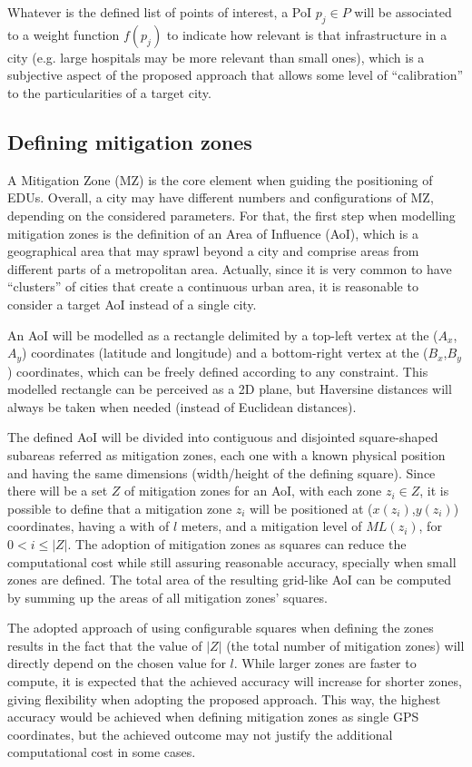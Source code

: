 \begin{refsection}
Whatever is the defined list of points of interest, a PoI $p_j \in P$ will be associated to a weight function $f(p_j)$ to indicate how relevant is that infrastructure in a city (e.g. large hospitals may be more relevant than small ones), which is a subjective aspect of the proposed approach that allows some level of ``calibration'' to the particularities of a target city.

%
\subsection{Defining mitigation zones}

A Mitigation Zone (MZ) is the core element when guiding the positioning of EDUs. Overall, a city may have different numbers and configurations of MZ, depending on the considered parameters. For that, the first step when modelling mitigation zones is the definition of an Area of Influence (AoI), which is a geographical area that may sprawl beyond a city and comprise areas from different parts of a metropolitan area. Actually, since it is very common to have ``clusters'' of cities that create a continuous urban area, it is reasonable to consider a target AoI instead of a single city. 

An AoI will be modelled as a rectangle delimited by a top-left vertex at the ($A_x$,$A_y$) coordinates (latitude and longitude) and a bottom-right vertex at the ($B_x$,$B_y$) coordinates, which can be freely defined according to any constraint. This modelled rectangle can be perceived as a 2D plane, but Haversine distances will always be taken when needed (instead of Euclidean distances). 

The defined AoI will be divided into contiguous and disjointed square-shaped subareas referred as mitigation zones, each one with a known physical position and having the same dimensions (width/height of the defining square). Since there will be a set $Z$ of mitigation zones for an AoI, with each zone $z_i \in Z$, it is possible to define that a mitigation zone $z_i$ will be positioned at ($x(z_i)$,$y(z_i)$) coordinates, having a with of $l$ meters, and a mitigation level of $ML(z_i)$, for $0 < i \le |Z|$. The adoption of mitigation zones as squares can reduce the computational cost while still assuring reasonable accuracy, specially when small zones are defined. The total area of the resulting grid-like AoI can be computed by summing up the areas of all mitigation zones' squares.

The adopted approach of using configurable squares when defining the zones results in the fact that the value of $|Z|$ (the total number of mitigation zones) will directly depend on the chosen value for $l$. While larger zones are faster to compute, it is expected that the achieved accuracy will increase for shorter zones, giving flexibility when adopting the proposed approach. This way, the highest accuracy would be achieved when defining mitigation zones as single GPS coordinates, but the achieved outcome may not justify the additional computational cost in some cases. 


\end{refsection}

